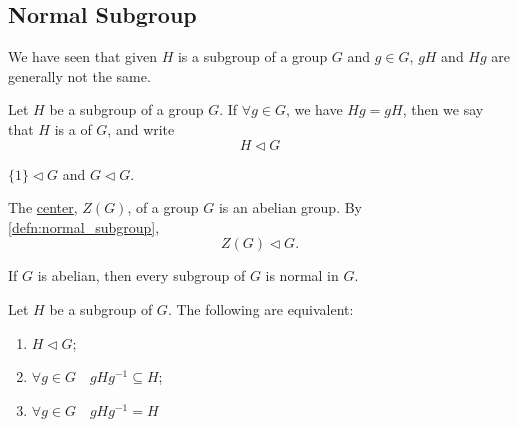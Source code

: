 \documentclass[notoc,notitlepage]{tufte-book}
\begin{document}

\subsection{Normal Subgroup}%
\label{sub:normal_subgroup}

We have seen that given $H$ is a subgroup of a group $G$ and $g \in G$, $gH$ and $Hg$ are generally not the same.

\begin{defn}
\label{defn:normal_subgroup}
  Let $H$ be a subgroup of a group $G$. If $\forall g \in G$, we have $Hg = gH$, then we say that $H$ is a  of $G$, and write
  \begin{equation*}
    H \triangleleft G
  \end{equation*}
\end{defn}

\begin{eg}
  $\{1\} \triangleleft G$ and $G \triangleleft G$.
\end{eg}

\begin{eg}
  The \hyperref[defn:center_of_a_group]{center}, $Z(G)$, of a group $G$ is an abelian group. By \cref{defn:normal_subgroup},
  \begin{equation*}
    Z(G) \triangleleft G.
  \end{equation*}
\end{eg}

\begin{eg}
  If $G$ is abelian, then every subgroup of $G$ is normal in $G$.
\end{eg}

\begin{propo*}
  Let $H$ be a subgroup of $G$. The following are equivalent:
  \begin{enumerate}
    \item $H \triangleleft G$;
    \item $\forall g \in G \quad gHg^{-1} \subseteq H$;
    \item $\forall g \in G \quad gHg^{-1} = H$ 
  \end{enumerate}
\end{propo*}
\end{document}

